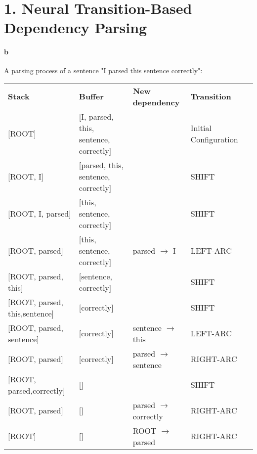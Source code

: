 \documentclass{article}
\begin{document}
\section*{1. Neural Transition-Based Dependency Parsing}
\paragraph{b}
A parsing process of a sentence "I parsed this sentence
correctly":

\begin{table}[h!]
\begin{tabular}{|l|l|l|l|l}
\cline{1-4}
\textbf{Stack}                    & \textbf{Buffer}                            & \textbf{New dependency} & \textbf{Transition}   &  \\ \cline{1-4}
{[}ROOT{]}                        & {[}I, parsed, this, sentence, correctly{]} &                         & Initial Configuration &  \\ \cline{1-4}
{[}ROOT, I{]}                     & {[}parsed, this, sentence, correctly{]}    &                         & SHIFT                 &  \\ \cline{1-4}
{[}ROOT, I, parsed{]}             & {[}this, sentence, correctly{]}            &                         & SHIFT                 &  \\ \cline{1-4}
{[}ROOT, parsed{]}                & {[}this, sentence, correctly{]}            & parsed $\rightarrow$ I                & LEFT-ARC              &  \\ \cline{1-4}
{[}ROOT, parsed, this{]}          & {[}sentence, correctly{]}                  &                         & SHIFT                 &  \\ \cline{1-4}
{[}ROOT, parsed, this,sentence{]} & {[}correctly{]}                            &                         & SHIFT                 &  \\ \cline{1-4}
{[}ROOT, parsed, sentence{]}      & {[}correctly{]}                            & sentence $\rightarrow$ this           & LEFT-ARC              &  \\ \cline{1-4}
{[}ROOT, parsed{]}                & {[}correctly{]}                            & parsed $\rightarrow$ sentence         & RIGHT-ARC             &  \\ \cline{1-4}
{[}ROOT, parsed,correctly{]}      & {[}{]}                                     &                         & SHIFT                 &  \\ \cline{1-4}
{[}ROOT, parsed{]}                & {[}{]}                                     & parsed $\rightarrow$ correctly        & RIGHT-ARC             &  \\ \cline{1-4}
{[}ROOT{]}                        & {[}{]}                                     & ROOT $\rightarrow$ parsed             & RIGHT-ARC             &  \\ \cline{1-4}
\end{tabular}
\end{table}
\end{document}
